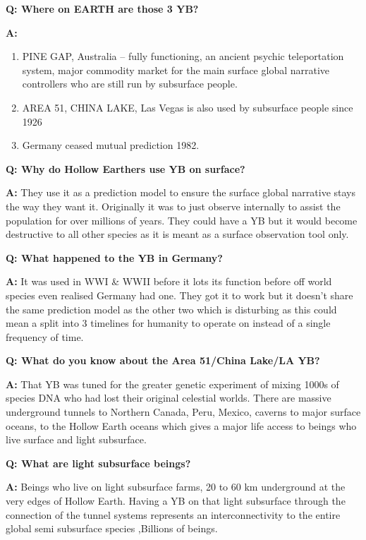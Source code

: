 \textbf{Q: Where on EARTH are those 3 YB?}

\textbf{A: }

\begin{enumerate}
\def\labelenumi{\arabic{enumi}.}
\item
  PINE GAP, Australia -- fully functioning, an ancient psychic
  teleportation system, major commodity market for the main surface
  global narrative controllers who are still run by subsurface people.
\item
  AREA 51, CHINA LAKE, Las Vegas is also used by subsurface people since
  1926
\item
  Germany ceased mutual prediction 1982.
\end{enumerate}

\textbf{Q: Why do Hollow Earthers use YB on surface?}

\textbf{A:} They use it as a prediction model to ensure the surface
global narrative stays the way they want it. Originally it was to just
observe internally to assist the population for over millions of years.
They could have a YB but it would become destructive to all other
species as it is meant as a surface observation tool only.

\textbf{Q: What happened to the YB in Germany?}

\textbf{A:} It was used in WWI \& WWII before it lots its function
before off world species even realised Germany had one. They got it to
work but it doesn't share the same prediction model as the other two
which is disturbing as this could mean a split into 3 timelines for
humanity to operate on instead of a single frequency of time.

\textbf{Q: What do you know about the Area 51/China Lake/LA YB?}

\textbf{A:} That YB was tuned for the greater genetic experiment of
mixing 1000s of species DNA who had lost their original celestial
worlds. There are massive underground tunnels to Northern Canada, Peru,
Mexico, caverns to major surface oceans, to the Hollow Earth oceans
which gives a major life access to beings who live surface and light
subsurface.

\textbf{Q: What are light subsurface beings?}

\textbf{A:} Beings who live on light subsurface farms, 20 to 60 km
underground at the very edges of Hollow Earth. Having a YB on that light
subsurface through the connection of the tunnel systems represents an
interconnectivity to the entire global semi subsurface species ,Billions
of beings.

